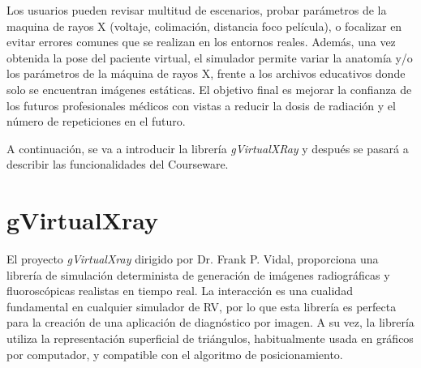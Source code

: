 Los usuarios pueden revisar multitud de escenarios, probar parámetros de la maquina de rayos X (voltaje, colimación, distancia foco película), o focalizar en evitar errores comunes que se realizan en los entornos reales. Además, una vez obtenida la pose del paciente virtual, el simulador permite variar la anatomía y/o los parámetros de la máquina de rayos X, frente a los archivos educativos donde solo se encuentran imágenes estáticas. El objetivo final es mejorar la confianza de los futuros profesionales médicos con vistas a reducir la dosis de radiación y el número de repeticiones en el futuro.%






A continuación, se va a introducir la librería \emph{gVirtualXRay} y después se pasará a describir las funcionalidades del \ac{Courseware}.


\section{gVirtualXray}
\label{xray:context}

El proyecto \emph{gVirtualXray} \cite{sujar:hal} dirigido por Dr. Frank P. Vidal, proporciona una librería de simulación determinista de generación de imágenes radiográficas y fluoroscópicas realistas en tiempo real. %
La interacción es una cualidad fundamental en cualquier simulador de \ac{RV}, por lo que esta librería es perfecta para la creación de una aplicación de diagnóstico por imagen. 
A su vez, la librería utiliza la representación superficial de triángulos, habitualmente usada en gráficos por computador, y compatible con el algoritmo de posicionamiento.

